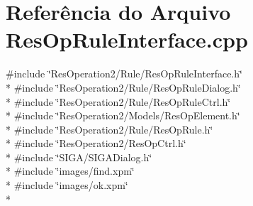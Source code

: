 \section{Referência do Arquivo Res\+Op\+Rule\+Interface.\+cpp}
\label{_2_rule_2_res_op_rule_interface_8cpp}
{\ttfamily \#include \char`\"{}Res\+Operation2/\+Rule/\+Res\+Op\+Rule\+Interface.\+h\char`\"{}}\\*
{\ttfamily \#include \char`\"{}Res\+Operation2/\+Rule/\+Res\+Op\+Rule\+Dialog.\+h\char`\"{}}\\*
{\ttfamily \#include \char`\"{}Res\+Operation2/\+Rule/\+Res\+Op\+Rule\+Ctrl.\+h\char`\"{}}\\*
{\ttfamily \#include \char`\"{}Res\+Operation2/\+Models/\+Res\+Op\+Element.\+h\char`\"{}}\\*
{\ttfamily \#include \char`\"{}Res\+Operation2/\+Rule/\+Res\+Op\+Rule.\+h\char`\"{}}\\*
{\ttfamily \#include \char`\"{}Res\+Operation2/\+Res\+Op\+Ctrl.\+h\char`\"{}}\\*
{\ttfamily \#include \char`\"{}S\+I\+G\+A/\+S\+I\+G\+A\+Dialog.\+h\char`\"{}}\\*
{\ttfamily \#include \char`\"{}images/find.\+xpm\char`\"{}}\\*
{\ttfamily \#include \char`\"{}images/ok.\+xpm\char`\"{}}\\*
